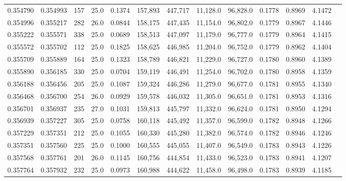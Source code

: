 \begin{tabular}{rrrrrrrrrrrrr}
0.354790 & 0.354993 &   157 & 25.0 &                                     0.1374 & 157,893 & 447,717 &  11,128.0 &  96,828.0 & 0.1778 & 0.8969 & 4.1472 \\
0.354996 & 0.355217 &   282 & 26.0 &                                     0.0844 & 158,175 & 447,435 &  11,154.0 &  96,802.0 & 0.1779 & 0.8967 & 4.1446 \\
0.355222 & 0.355571 &   338 & 25.0 &                                     0.0689 & 158,513 & 447,097 &  11,179.0 &  96,777.0 & 0.1779 & 0.8964 & 4.1415 \\
0.355572 & 0.355702 &   112 & 25.0 &                                     0.1825 & 158,625 & 446,985 &  11,204.0 &  96,752.0 & 0.1779 & 0.8962 & 4.1404 \\
0.355709 & 0.355889 &   164 & 25.0 &                                     0.1323 & 158,789 & 446,821 &  11,229.0 &  96,727.0 & 0.1780 & 0.8960 & 4.1389 \\
0.355890 & 0.356185 &   330 & 25.0 &                                     0.0704 & 159,119 & 446,491 &  11,254.0 &  96,702.0 & 0.1780 & 0.8958 & 4.1359 \\
0.356188 & 0.356456 &   205 & 25.0 &                                     0.1087 & 159,324 & 446,286 &  11,279.0 &  96,677.0 & 0.1781 & 0.8955 & 4.1340 \\
0.356468 & 0.356700 &   254 & 26.0 &                                     0.0929 & 159,578 & 446,032 &  11,305.0 &  96,651.0 & 0.1781 & 0.8953 & 4.1316 \\
0.356701 & 0.356937 &   235 & 27.0 &                                     0.1031 & 159,813 & 445,797 &  11,332.0 &  96,624.0 & 0.1781 & 0.8950 & 4.1294 \\
0.356939 & 0.357227 &   305 & 25.0 &                                     0.0758 & 160,118 & 445,492 &  11,357.0 &  96,599.0 & 0.1782 & 0.8948 & 4.1266 \\
0.357229 & 0.357351 &   212 & 25.0 &                                     0.1055 & 160,330 & 445,280 &  11,382.0 &  96,574.0 & 0.1782 & 0.8946 & 4.1246 \\
0.357351 & 0.357560 &   225 & 25.0 &                                     0.1000 & 160,555 & 445,055 &  11,407.0 &  96,549.0 & 0.1783 & 0.8943 & 4.1226 \\
0.357568 & 0.357761 &   201 & 26.0 &                                     0.1145 & 160,756 & 444,854 &  11,433.0 &  96,523.0 & 0.1783 & 0.8941 & 4.1207 \\
0.357764 & 0.357932 &   232 & 25.0 &                                     0.0973 & 160,988 & 444,622 &  11,458.0 &  96,498.0 & 0.1783 & 0.8939 & 4.1185 \\

\end{tabular}
